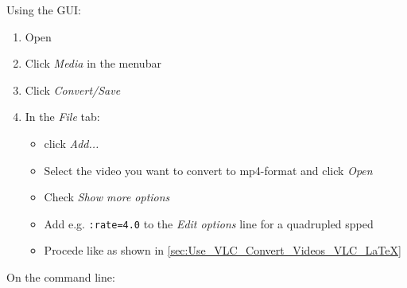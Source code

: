 

Using the GUI:

\begin{enumerate}[noitemsep]
  \item Open
  \item Click \textit{Media} in the menubar
  \item Click \textit{Convert/Save}
  \item In the \textit{File} tab:
  \begin{itemize}[noitemsep]
    \item click \textit{Add...}
    \item Select the video you want to convert to mp4-format and click \textit{Open}
    \item Check \textit{Show more options}
    \item Add e.g. \lstinline[style=inlinetexstyle]+:rate=4.0+ to the \textit{Edit options} line for a quadrupled spped
    \item Procede like as shown in \autoref{sec:Use_VLC_Convert_Videos_VLC_LaTeX}
  \end{itemize}
\end{enumerate}

On the command line:

\begingroup
\lstset{breaklines = true}
\endgroup